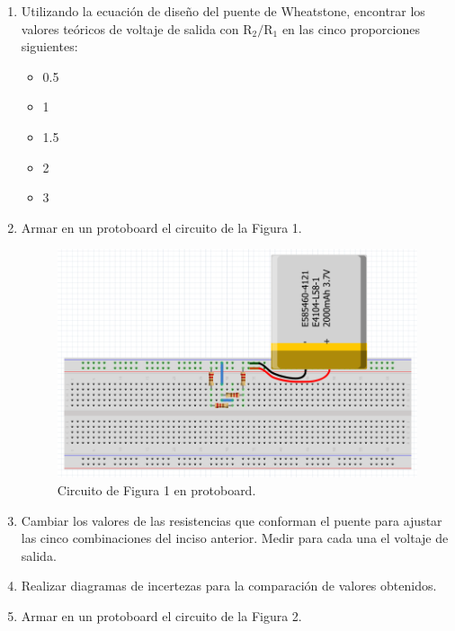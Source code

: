 \documentclass[letterpaper, 12 pt, conference]{ieeeconf}  %
\begin{document}
\begin{enumerate}
    \item Utilizando la ecuación de diseño del puente de Wheatstone, encontrar los valores teóricos de voltaje de salida con R$_{2}/$R$_{1}$ en las cinco proporciones siguientes:
    \begin{itemize}
        \item 0.5
        \item 1
        \item 1.5
        \item 2
        \item 3
    \end{itemize}
    \item Armar en un protoboard el circuito de la Figura 1.

\begin{figure}[h!]
    \centering
    \includegraphics[scale=0.4]{B1.png}
    \caption{Circuito de Figura 1 en protoboard.}
\end{figure}
    \item Cambiar los valores de las resistencias que conforman el puente para ajustar las cinco combinaciones del inciso anterior. Medir para cada una el voltaje de salida.
    \item Realizar diagramas de incertezas para la comparación de valores obtenidos.
    \item Armar en un protoboard el circuito de la Figura 2.


\end{enumerate}
\end{document}
